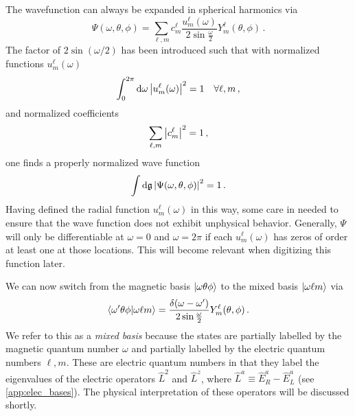 \documentclass[reprint,superscriptaddress,pra,nofootinbib,preprintnumbers,floatfix]{revtex4-1}
\providecommand{\g}{{\mathfrak{g}}}
\begin{document}
The wavefunction can always be expanded in spherical harmonics via
%
\begin{equation}\label{eq:single_wf}
    \Psi(\omega, \theta, \phi)
      = \sum_{\ell, m} c^\ell_m \frac{u^{\ell}_m(\omega)}{2\sin\frac{\omega}{2}}
                         Y^\ell_m(\theta, \phi) \,.
\end{equation}
%
The factor of $2\sin(\omega/2)$ has been introduced such that with normalized functions $u^\ell_m(\omega)$
%
\begin{equation}
    \int_0^{2\pi} \dd{\omega} \abs{u^\ell_m(\omega)}^2 = 1 \quad \forall \ell, m \,,
\end{equation}
%
and normalized coefficients
%
\begin{equation}
    \sum_{\ell,m} \abs{c^\ell_m}^2 = 1 \,,
\end{equation}
%
one finds a properly normalized wave function
%
\begin{equation}
    \int\dd{\g}  \abs{\Psi(\omega, \theta, \phi)}^2 = 1 \,.
\end{equation}
%
Having defined the radial function $u^\ell_m(\omega)$ in this way, some care in needed to ensure that the wave function does not exhibit unphysical behavior. 
%
Generally, $\Psi$ will only be differentiable at $\omega=0$ and $\omega=2\pi$ if each $u^\ell_m(\omega)$ has zeros of order at least one at those locations. 
%
This will become relevant when digitizing this function later.



We can now switch from the magnetic basis $\ket{\omega\theta\phi}$ to the mixed basis $\ket{\omega \ell m}$ via
%
\begin{equation}
    \bra{\omega' \theta \phi}\ket{\omega \ell m}
      = \frac{\delta(\omega-\omega')}{2 \sin\frac{\omega}{2}} Y^\ell_m(\theta,\phi) \,.
\end{equation}
%
We refer to this as a \emph{mixed basis} because the states are partially labelled by the magnetic quantum number $\omega$ and partially labelled by the electric quantum numbers $\ell,m$.
%
These are electric quantum numbers in that they label the eigenvalues of the electric operators $\hat{L}^2$ and $\hat{L}^z$, where $\hat{L}^a \equiv \hat{E}_R^a - \hat{E}_L^a$ (see \cref{app:elec_bases}).
%
The physical interpretation of these operators will be discussed shortly.
\end{document}
